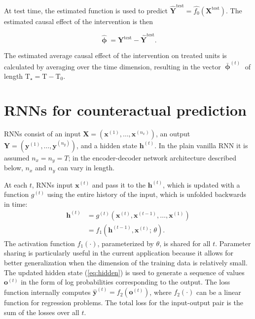 At test time, the estimated function is used to predict $\boldsymbol{\hat{Y}}^{\text{test}} = \hat{f_0} \left(\boldsymbol{X}^{\text{test}}\right)$. The estimated causal effect of the intervention is then

\begin{equation}\label{eq:pointwise}
	\boldsymbol{\hat{\upphi}} = \boldsymbol{Y}^{\text{test}} - \boldsymbol{\hat{Y}}^{\text{test}}. 
\end{equation}

The estimated average causal effect of the intervention on treated units is calculated by averaging over the time dimension, resulting in the vector $\boldsymbol{\bar{\upphi}}^{(t)}$ of length $\text{T}_\star = \text{T}-\text{T}_0$. 

\section{RNNs for counteractual prediction} \label{RNNs-section}

RNNs \citep{graves2012,goodfellow2016deep} consist of an input $\boldsymbol{X} = \left(\boldsymbol{x}^{(1)}, \ldots, \boldsymbol{x}^{(n_x)}\right)$, an output $\boldsymbol{Y} = \left(\boldsymbol{y}^{(1)}, \ldots, \boldsymbol{y}^{(n_y)}\right)$, and a hidden state $\boldsymbol{h}^{(t)}$. In the plain vanilla RNN it is assumed $n_x = n_y = T$; in the encoder-decoder network architecture described below, $n_x$ and $n_y$ can vary in length. 

At each $t$, RNNs input $\boldsymbol{x}^{(t)}$ and pass it to the $\boldsymbol{h}^{(t)}$, which is updated with a function $g^{(t)}$ using the entire history of the input, which is unfolded backwards in time:
%
\begin{align}
	\boldsymbol{h}^{(t)} &= g^{(t)} \left(\boldsymbol{x}^{(t)}, \boldsymbol{x}^{(t-1)}, \ldots, \boldsymbol{x}^{(1)} \right) \\ 
	&= f_1 \left( \boldsymbol{h}^{(t-1)}, \boldsymbol{x}^{(t)}; \, \theta \right). \label{eq:hidden}
\end{align} 
The activation function $f_1 (\cdot)$, parameterized by $\theta$, is shared for all $t$. Parameter sharing is particularly useful in the current application because it allows for better generalization when the dimension of the training data is relatively small. The updated hidden state (\ref{eq:hidden}) is used to generate a sequence of values $\boldsymbol{o}^{(t)}$ in the form of log probabilities corresponding to the output. The loss function internally computes $\boldsymbol{\hat{y}}^{(t)} = f_2 \left(\boldsymbol{o}^{(t)}\right)$, where $f_2 (\cdot)$ can be a linear function for regression problems. The total loss for the input-output pair is the sum of the losses over all $t$.


